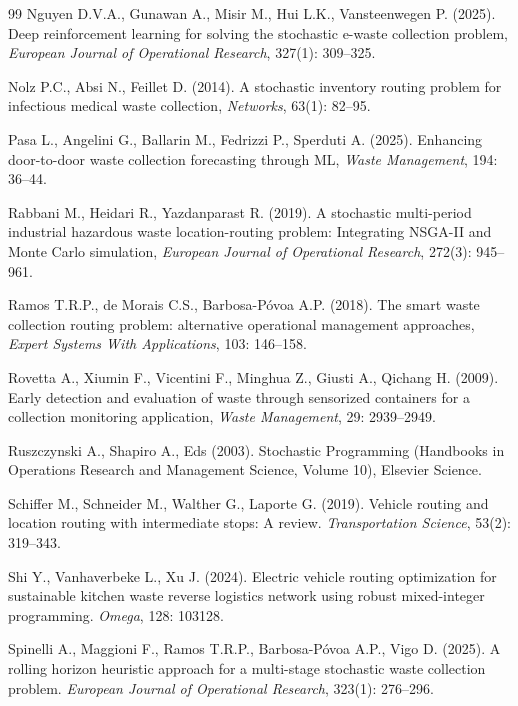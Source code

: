 \documentclass[preprint,11pt,authoryear]{elsarticle}
\begin{document}
\begin{thebibliography}{99}
Nguyen D.V.A., Gunawan A., Misir M., Hui L.K., Vansteenwegen P. (2025). Deep reinforcement learning for solving the stochastic e-waste collection problem, \textit{European Journal of Operational Research}, 327(1): 309--325. 

Nolz P.C., Absi N., Feillet D. (2014). A stochastic inventory routing problem for infectious medical waste collection, \textit{Networks}, 63(1): 82--95.

Pasa L., Angelini G., Ballarin M., Fedrizzi P., Sperduti A. (2025). Enhancing door-to-door waste collection forecasting through ML, \textit{Waste Management},
194: 36--44.

Rabbani M., Heidari R., Yazdanparast R. (2019). A stochastic multi-period industrial hazardous waste location-routing problem: Integrating NSGA-II and Monte Carlo simulation, \textit{European Journal of Operational Research}, 272(3): 945--961.

Ramos T.R.P., de Morais C.S., Barbosa-Póvoa A.P. (2018). The smart waste collection routing problem: alternative operational management approaches, \textit{Expert Systems With Applications}, 103: 146--158.

Rovetta A., Xiumin F., Vicentini F., Minghua Z., Giusti A., Qichang H. (2009). Early detection and evaluation of waste through sensorized containers
for a collection monitoring application, \textit{Waste Management}, 29: 2939--2949.

Ruszczynski A., Shapiro A., Eds (2003). Stochastic Programming (Handbooks in Operations Research and Management Science, Volume 10), Elsevier Science.

Schiffer M., Schneider M., Walther G., Laporte G. (2019). Vehicle routing and location routing with intermediate stops: A review. \textit{Transportation Science}, 53(2): 319--343.

 Shi Y., Vanhaverbeke L., Xu J. (2024). Electric vehicle routing optimization for sustainable kitchen waste reverse logistics network using robust mixed-integer programming. \textit{Omega},  128: 103128.

Spinelli A., Maggioni F., Ramos T.R.P., Barbosa-Póvoa A.P., Vigo D. (2025). A rolling horizon heuristic approach for a multi-stage stochastic waste collection problem. \textit{European Journal of Operational Research}, 323(1): 276--296.


\end{thebibliography}
\end{document}

